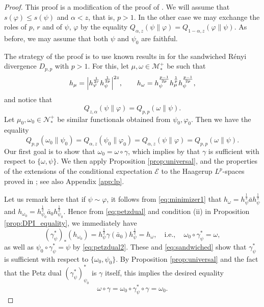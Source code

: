\documentclass[12pt]{article}
\theoremstyle{definition}
\theoremstyle{remark}
\numberwithin{equation}{section}
\def\cE{\mathcal E}
\def\Me{\mathcal M}
\def\Ne{\mathcal N}
\def\ffi{\varphi}
\begin{document}
\begin{proof} This proof is a modification of the proof of \cite[Theorem
5.1]{jencova2021renyi}.  
We will assume that $s(\ffi)\le s(\psi)$ and $\alpha<z$, that is, $p>1$. In the other case we may
exchange the roles of $p$, $r$ and of $\psi$, $\ffi$ by the equality
$Q_{\alpha,z}(\psi\|\varphi)=Q_{1-\alpha,z}(\varphi\|\psi)$. As before, we may assume that
both $\psi$ and $\psi_0$ are faithful.

The strategy of the proof is to use known results in \cite{jencova2018renyi} for the sandwiched
R\'enyi divergence $D_{p,p}$ with $p>1$. For this, {let $\mu,\omega\in\Me_*^+$ be such that
\[
h_{\mu}=\Big|h_{\ffi}^{1\over 2r}h_{\psi}^{1\over 2p}\Big|^{2z},\qquad
h_\omega=h_\psi^{p-1\over 2p}h_\mu^{\frac1p}h_\psi^{p-1\over 2p},
\]}
and notice that
\[
Q_{z,\alpha}(\psi\|\ffi)=Q_{p,p}(\omega\|\psi).
\]
Let $\mu_0,\omega_0\in \Ne_*^+$ be similar functionals obtained from $\psi_0,\ffi_0$. Then
we have the equality
\begin{equation}\label{eq:sandwiched}
Q_{p,p}(\omega_0\|\psi_0)=Q_{\alpha,z}(\psi_0\|\ffi_0)=Q_{\alpha,z}(\psi\|\ffi)=Q_{p,p}(\omega\|\psi).
\end{equation}
Our first goal is to show that $\omega_0=\omega\circ\gamma$, which implies by
\cite[Theorem 4.6]{jencova2018renyi} that $\gamma$ is sufficient with respect to $\{\omega,\psi\}$. 
 We then apply Proposition \ref{prop:universal},  and the properties of the extensions of the
conditional expectation $\cE$ to the Haagerup $L^p$-spaces proved in
\cite{junge2003noncommutative}; see also Appendix \ref{app:lp}.

Let us remark here that if $\psi\sim \ffi$, {it follows from \eqref{eq:minimizer1} that}
$h_\omega=h_\psi^{\frac12}\bar ah_\psi^{\frac12}$ and
$h_{\omega_0}=h_{\psi_0}^{\frac12}\bar a_0h_{\psi_0}^{\frac12}$. Hence from {\eqref{eq:petzdual}
and condition (ii)} in Proposition \ref{prop:DPI_equality}, we immediately have
\[
(\gamma^*_{\psi})_*(h_{\omega_0})=h_\psi^{\frac12}\gamma(\bar
a_0)h_\psi^{\frac12}=h_\omega,\quad
{\mbox{i.e.},\quad\omega_0\circ\gamma_\psi^*=\omega,}
\]
{as well as $\psi_0\circ\gamma_\psi^*=\psi$ by \eqref{eq:petzdual2}.}
These and \eqref{eq:sandwiched} {show} that $\gamma^*_\psi$ is sufficient with respect to
$\{\omega_0,\psi_0\}$. By Proposition \ref{prop:universal} and the fact that the
Petz dual  $(\gamma_\psi^*)_{\psi_0}^*$ is $\gamma$ itself, this implies the desired
equality
\[
\omega\circ\gamma= \omega_0\circ \gamma_\psi^*\circ\gamma=\omega_0.
\]


\end{proof}
\end{document}
